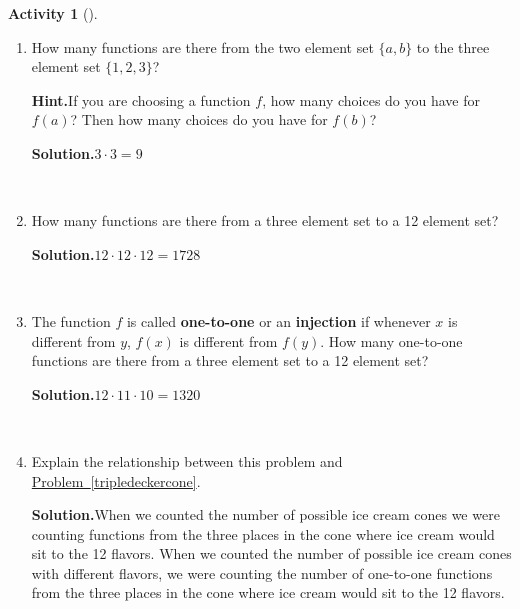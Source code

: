 \documentclass[10pt,]{book}
\newcommand{\terminology}[1]{\textbf{#1}}
\theoremstyle{plain}
\theoremstyle{definition}
\newtheorem{activity}[project]{Activity}
\numberwithin{equation}{chapter}
\begin{document}
\begin{activity}[]
\begin{enumerate}[label=(\alph*)]
~\par
\item How many functions are there from the two element set \(\{a,b\}\) to the three element set \(\{1,2,3\}\)?%
\par\medskip\noindent%
\textbf{Hint.}\quad If you are choosing a function \(f\), how many choices do you have for \(f(a)\)? Then how many choices do you have for \(f(b)\)?%
\par\medskip\noindent%
\textbf{Solution.}\quad \(3\cdot3=9\)%

~\par
\item How many functions are there from a three element set to a 12 element set?%
\par\medskip\noindent%
\textbf{Solution.}\quad \(12\cdot 12\cdot 12 = 1728\)%

~\par
\item The function \(f\) is called \terminology{one-to-one} or an \terminology{injection} if whenever \(x\) is different from \(y\), \(f(x)\) is different from \(f(y)\).  How many one-to-one functions are there from a three element set to a  12 element set?%
\par\medskip\noindent%
\textbf{Solution.}\quad \(12\cdot 11 \cdot 10= 1320\)%

~\par
\item Explain the relationship between this problem and \hyperref[tripledeckercone]{Problem~\ref{tripledeckercone}}.%
\par\medskip\noindent%
\textbf{Solution.}\quad When we counted the number of possible ice cream cones we were counting functions from the three places in the cone where ice cream would sit to the 12 flavors. When we counted the number of possible ice cream cones with different flavors, we were counting the number of one-to-one functions from the three places in the cone where ice cream would sit to the 12 flavors.%

\end{enumerate}
\end{activity}
\end{document}
